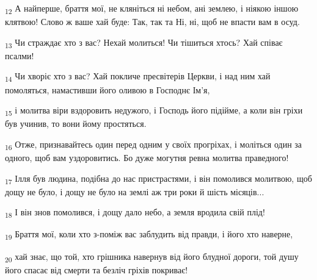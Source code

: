 \begin{tcolorbox}
\textsubscript{12} А найперше, браття мої, не кляніться ні небом, ані землею, і ніякою іншою клятвою! Слово ж ваше хай буде: Так, так та Ні, ні, щоб не впасти вам в осуд.
\end{tcolorbox}
\begin{tcolorbox}
\textsubscript{13} Чи страждає хто з вас? Нехай молиться! Чи тішиться хтось? Хай співає псалми!
\end{tcolorbox}
\begin{tcolorbox}
\textsubscript{14} Чи хворіє хто з вас? Хай покличе пресвітерів Церкви, і над ним хай помоляться, намастивши його оливою в Господнє Ім'я,
\end{tcolorbox}
\begin{tcolorbox}
\textsubscript{15} і молитва віри вздоровить недужого, і Господь його підійме, а коли він гріхи був учинив, то вони йому простяться.
\end{tcolorbox}
\begin{tcolorbox}
\textsubscript{16} Отже, признавайтесь один перед одним у своїх прогріхах, і моліться один за одного, щоб вам уздоровитись. Бо дуже могутня ревна молитва праведного!
\end{tcolorbox}
\begin{tcolorbox}
\textsubscript{17} Ілля був людина, подібна до нас пристрастями, і він помолився молитвою, щоб дощу не було, і дощу не було на землі аж три роки й шість місяців...
\end{tcolorbox}
\begin{tcolorbox}
\textsubscript{18} І він знов помолився, і дощу дало небо, а земля вродила свій плід!
\end{tcolorbox}
\begin{tcolorbox}
\textsubscript{19} Браття мої, коли хто з-поміж вас заблудить від правди, і його хто наверне,
\end{tcolorbox}
\begin{tcolorbox}
\textsubscript{20} хай знає, що той, хто грішника навернув від його блудної дороги, той душу його спасає від смерти та безліч гріхів покриває!
\end{tcolorbox}
